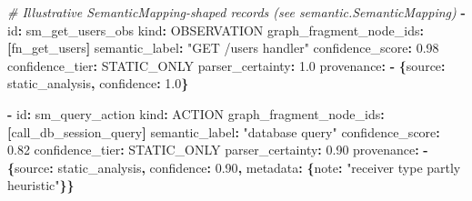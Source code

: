 \documentclass[
]{article}
\newenvironment{Shaded}{}{}
\newcommand{\AttributeTok}[1]{\textcolor[rgb]{0.49,0.56,0.16}{#1}}
\newcommand{\CommentTok}[1]{\textcolor[rgb]{0.38,0.63,0.69}{\textit{#1}}}
\newcommand{\FloatTok}[1]{\textcolor[rgb]{0.25,0.63,0.44}{#1}}
\newcommand{\FunctionTok}[1]{\textcolor[rgb]{0.02,0.16,0.49}{#1}}
\newcommand{\KeywordTok}[1]{\textcolor[rgb]{0.00,0.44,0.13}{\textbf{#1}}}
\newcommand{\StringTok}[1]{\textcolor[rgb]{0.25,0.44,0.63}{#1}}
\begin{document}
\begin{Shaded}
\begin{Highlighting}[]
\CommentTok{\# Illustrative SemanticMapping{-}shaped records (see semantic.SemanticMapping)}
\KeywordTok{{-}}\AttributeTok{ }\FunctionTok{id}\KeywordTok{:}\AttributeTok{ sm\_get\_users\_obs}
\AttributeTok{  }\FunctionTok{kind}\KeywordTok{:}\AttributeTok{ OBSERVATION}
\AttributeTok{  }\FunctionTok{graph\_fragment\_node\_ids}\KeywordTok{:}\AttributeTok{ }\KeywordTok{[}\AttributeTok{fn\_get\_users}\KeywordTok{]}
\AttributeTok{  }\FunctionTok{semantic\_label}\KeywordTok{:}\AttributeTok{ }\StringTok{"GET /users handler"}
\AttributeTok{  }\FunctionTok{confidence\_score}\KeywordTok{:}\AttributeTok{ }\FloatTok{0.98}
\AttributeTok{  }\FunctionTok{confidence\_tier}\KeywordTok{:}\AttributeTok{ STATIC\_ONLY}
\AttributeTok{  }\FunctionTok{parser\_certainty}\KeywordTok{:}\AttributeTok{ }\FloatTok{1.0}
\AttributeTok{  }\FunctionTok{provenance}\KeywordTok{:}
\AttributeTok{    }\KeywordTok{{-}}\AttributeTok{ }\KeywordTok{\{}\FunctionTok{source}\KeywordTok{:}\AttributeTok{ static\_analysis}\KeywordTok{,}\AttributeTok{ }\FunctionTok{confidence}\KeywordTok{:}\AttributeTok{ }\FloatTok{1.0}\KeywordTok{\}}

\KeywordTok{{-}}\AttributeTok{ }\FunctionTok{id}\KeywordTok{:}\AttributeTok{ sm\_query\_action}
\AttributeTok{  }\FunctionTok{kind}\KeywordTok{:}\AttributeTok{ ACTION}
\AttributeTok{  }\FunctionTok{graph\_fragment\_node\_ids}\KeywordTok{:}\AttributeTok{ }\KeywordTok{[}\AttributeTok{call\_db\_session\_query}\KeywordTok{]}
\AttributeTok{  }\FunctionTok{semantic\_label}\KeywordTok{:}\AttributeTok{ }\StringTok{"database query"}
\AttributeTok{  }\FunctionTok{confidence\_score}\KeywordTok{:}\AttributeTok{ }\FloatTok{0.82}
\AttributeTok{  }\FunctionTok{confidence\_tier}\KeywordTok{:}\AttributeTok{ STATIC\_ONLY}
\AttributeTok{  }\FunctionTok{parser\_certainty}\KeywordTok{:}\AttributeTok{ }\FloatTok{0.90}
\AttributeTok{  }\FunctionTok{provenance}\KeywordTok{:}
\AttributeTok{    }\KeywordTok{{-}}\AttributeTok{ }\KeywordTok{\{}\FunctionTok{source}\KeywordTok{:}\AttributeTok{ static\_analysis}\KeywordTok{,}\AttributeTok{ }\FunctionTok{confidence}\KeywordTok{:}\AttributeTok{ }\FloatTok{0.90}\KeywordTok{,}\AttributeTok{ }\FunctionTok{metadata}\KeywordTok{:}\AttributeTok{ }\KeywordTok{\{}\FunctionTok{note}\KeywordTok{:}\AttributeTok{ }\StringTok{"receiver type partly heuristic"}\KeywordTok{\}\}}


\end{Highlighting}
\end{Shaded}
\end{document}
